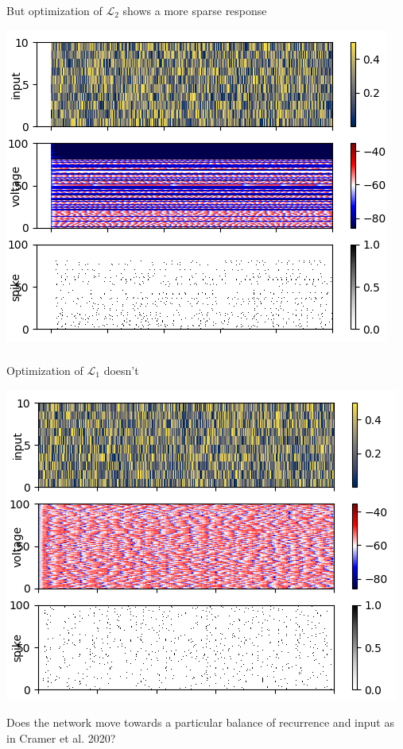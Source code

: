 \documentclass{beamer}
\begin{document}
\begin{frame}[plain]
\frametitle{} 

But optimization of $\mathcal{L}_{2}$ shows a more sparse response

\begin{center}
\includegraphics[scale=0.7]{alpha-traces}
\end{center}

\end{frame}

\begin{frame}[plain]
\frametitle{} 

Optimization of $\mathcal{L}_{1}$ doesn't

\begin{center}
\includegraphics[scale=0.65]{global-traces}
\end{center}

Does the network move towards a particular balance of recurrence and input as in Cramer et al. 2020?

\end{frame}
\end{document}
